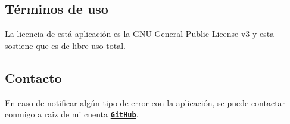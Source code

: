 \subsection*{Términos de uso}

La licencia de está aplicación es la G\+NU General Public License v3 y esta sostiene que es de libre uso total.



\subsection*{Contacto}

En caso de notificar algún tipo de error con la aplicación, se puede contactar conmigo a raiz de mi cuenta \href{https://github.com/FosterGun}{\texttt{ {\bfseries{Git\+Hub}}}}. 